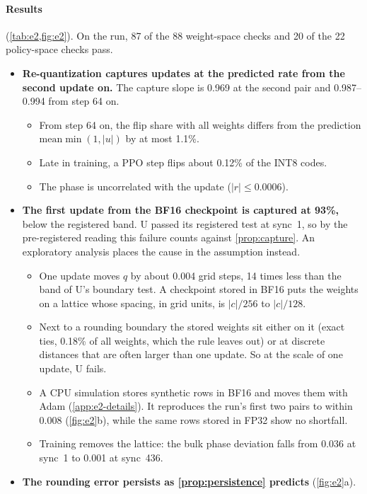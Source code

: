 \paragraph{Results} (\cref{tab:e2,fig:e2}). On the run, 87 of the 88 weight-space checks and 20 of the 22 policy-space checks pass.
\begin{itemize}[leftmargin=*,itemsep=2pt]
\item \textbf{Re-quantization captures updates at the predicted rate from the second update on.} The capture slope is 0.969 at the second pair and 0.987--0.994 from step 64 on.
  \begin{itemize}[leftmargin=*,itemsep=1pt]
  \item From step 64 on, the flip share with all weights differs from the prediction $\mathrm{mean}\min(1,|u|)$ by at most 1.1\%.
  \item Late in training, a PPO step flips about 0.12\% of the INT8 codes.
  \item The phase is uncorrelated with the update ($|r|\le0.0006$).
  \end{itemize}
\item \textbf{The first update from the BF16 checkpoint is captured at 93\%,} below the registered band. U passed its registered test at sync~1, so by the pre-registered reading this failure counts against \cref{prop:capture}. An exploratory analysis places the cause in the assumption instead.
  \begin{itemize}[leftmargin=*,itemsep=1pt]
  \item One update moves $q$ by about 0.004 grid steps, 14 times less than the band of U's boundary test. A checkpoint stored in BF16 puts the weights on a lattice whose spacing, in grid units, is $|c|/256$ to $|c|/128$.
  \item Next to a rounding boundary the stored weights sit either on it (exact ties, 0.18\% of all weights, which the rule leaves out) or at discrete distances that are often larger than one update. So at the scale of one update, U fails.
  \item A CPU simulation stores synthetic rows in BF16 and moves them with Adam (\cref{app:e2-details}). It reproduces the run's first two pairs to within 0.008 (\cref{fig:e2}b), while the same rows stored in FP32 show no shortfall.
  \item Training removes the lattice: the bulk phase deviation falls from 0.036 at sync~1 to 0.001 at sync~436.
  \end{itemize}
\item \textbf{The rounding error persists as \cref{prop:persistence} predicts} (\cref{fig:e2}a).

\end{itemize}
